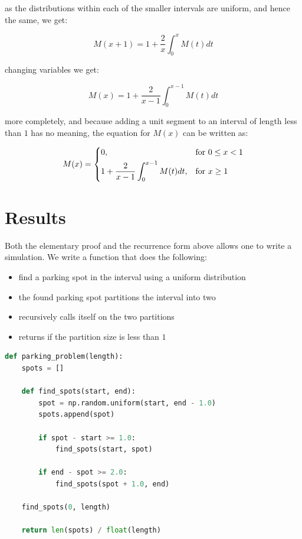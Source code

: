\documentclass{report}
\begin{document}
as the distributions within each of the smaller intervals are uniform, and hence the same, we get: \bigskip

\[
	M(x + 1) = 1 + \frac{2}{x} \int_{0}^{x} M(t) dt
\]\medskip

changing variables we get: \bigskip

\[
	M(x) = 1 + \frac{2}{x - 1} \int_{0}^{x - 1} M(t) dt
\]\medskip

more completely, and because adding a unit segment to an interval of length less than $1$ has no meaning, 
the equation for $M(x)$ can be written as: \bigskip

\[
	M(x) = 
	\begin{dcases}
		0,                                            & \text{for } 0 \leq x < 1 \\
		1 + \frac{2}{x - 1} \int_{0}^{x - 1} M(t) dt, & \text{for } x \geq 1
	\end{dcases}
\]\medskip






\chapter{Results}

Both the elementary proof and the recurrence form above allows one to write a simulation. We write a function 
that does the following: \bigskip

\begin{itemize}
	\item find a parking spot  in the interval using a uniform distribution
	\item the found parking spot partitions the interval into two
	\item recursively calls itself on the two partitions
	\item returns if the partition size is less than $1$
\end{itemize}\medskip

\begin{lstlisting}[language=Python, caption=Parking problem function]
def parking_problem(length):
	spots = []
	
	def find_spots(start, end):
		spot = np.random.uniform(start, end - 1.0)
		spots.append(spot)
		
		if spot - start >= 1.0:
			find_spots(start, spot)
		
		if end - spot >= 2.0:
			find_spots(spot + 1.0, end)
	
	find_spots(0, length)
	
	return len(spots) / float(length)
\end{lstlisting}\medskip
\end{document}

